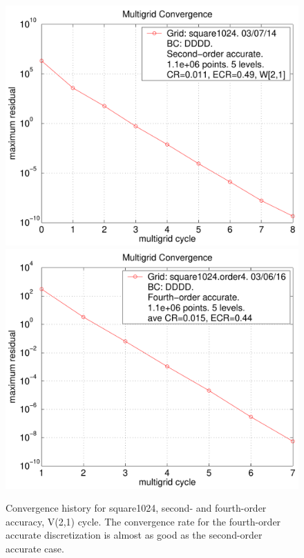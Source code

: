 \begin{figure}[hbt]
\begin{center}
  \includegraphics[width=.475\linewidth]{fig/residual_square1024}
  \includegraphics[width=.475\linewidth]{fig/residual_square1024_order4}
  \end{center} 
\caption{Convergence history for square1024, second- and fourth-order accuracy, V(2,1) cycle.
The convergence rate for the fourth-order accurate discretization is almost as good as the second-order accurate case.
}
\label{fig:square1024}
\end{figure}




